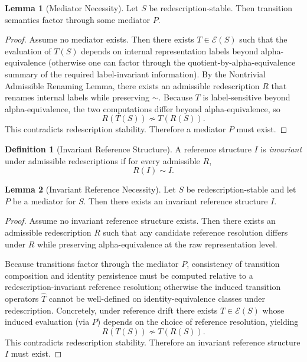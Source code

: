 \documentclass[11pt]{article}
\theoremstyle{definition}
\newtheorem{definition}{Definition}
\newtheorem{lemma}{Lemma}
\begin{document}
\begin{lemma}[Mediator Necessity]
Let $S$ be redescription-stable. Then transition semantics factor through some mediator $P$.
\end{lemma}

\begin{proof}
Assume no mediator exists. Then there exists $T\in\mathcal{E}(S)$ such that the evaluation of $T(S)$ depends on internal
representation labels beyond alpha-equivalence (otherwise one can factor through the quotient-by-alpha-equivalence summary of
the required label-invariant information). By the Nontrivial Admissible Renaming Lemma, there exists an admissible redescription
$R$ that renames internal labels while preserving $\sim$. Because $T$ is label-sensitive beyond alpha-equivalence, the two
computations differ beyond alpha-equivalence, so
\[
R(T(S)) \not\sim T(R(S)).
\]
This contradicts redescription stability. Therefore a mediator $P$ must exist.
\end{proof}

\begin{definition}[Invariant Reference Structure]
A reference structure $I$ is \emph{invariant} under admissible redescriptions if for every admissible $R$,
\[
R(I)\sim I.
\]
\end{definition}

\begin{lemma}[Invariant Reference Necessity]
Let $S$ be redescription-stable and let $P$ be a mediator for $S$. Then there exists an invariant reference structure $I$.
\end{lemma}

\begin{proof}
Assume no invariant reference structure exists. Then there exists an admissible redescription $R$ such that any candidate
reference resolution differs under $R$ while preserving alpha-equivalence at the raw representation level.

Because transitions factor through the mediator $P$, consistency of transition composition and identity persistence must be
computed relative to a redescription-invariant reference resolution; otherwise the induced transition operators $\widehat{T}$
cannot be well-defined on identity-equivalence classes under redescription. Concretely, under reference drift there exists
$T\in\mathcal{E}(S)$ whose induced evaluation (via $P$) depends on the choice of reference resolution, yielding
\[
R(T(S)) \not\sim T(R(S)).
\]
This contradicts redescription stability. Therefore an invariant reference structure $I$ must exist.
\end{proof}
\end{document}
